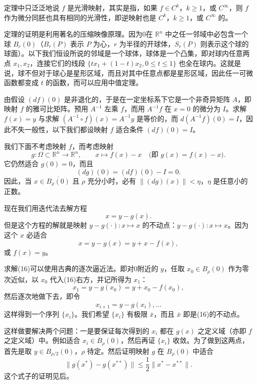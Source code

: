 定理中只泛泛地说 $f$ 是光滑映射，其实是指，如果 $f\in C^k$，$k\ge1$，或 $C^\infty$，则 $f$ 作为微分同胚也具有相同的光滑性，即逆映射也是 $C^k$，$k\ge1$，或 $C^\infty$ 的。

定理的证明是利用著名的压缩映像原理。因为0在 $\mathbb R^n$ 中之任一邻域中必包含一个球 $B_r(0)$（$B_r(P)$ 表示 $P$ 为心，$r$ 为半径的开球体，$S_r(P)$ 则表示这个球的球面）。以下我们恒设所说的邻域是一个球体，球体是一个凸集，即对球内任意两点 $x_1,x_2$，连接它们的线段 $\{tx_1+(1-t)x_2,0\le t\le1\}$ 也全在球内。这就是说，球不但对于球心是星形区域，而且对其中任意点都是星形区域，因此任一可微函数都变成 $t$ 的函数，而可以应用中值定理。

由假设 $(df)(0)$ 是非退化的，于是在一定坐标系下它是一个非奇异矩阵 $A$，即映射 $f$ 的雅可比矩阵。预用 $A^{-1}$ 左乘 $f$，而用 $A^{-1}f$ 在 $x=0$ 的微分为 $I$。求解 $f(x)=y$ 与求解 $(A^{-1}\circ f)(x)=A^{-1}y$ 是等价的，而 $d(A^{-1}f)(0)=I$，因此不失一般性，以下我们都设映射 $f$ 适合条件 $(df)(0)=I$。

我们下面不考虑映射 $f$，而考虑映射
\begin{equation}
 g:\Omega\subset\mathbb R^n\to\mathbb R^n,
 \qquad x\longmapsto f(x)-x\quad\text{(即 }g(x)=f(x)-x\text{)}.
 \tag{14}
\end{equation}
它仍然适合 $g(0)=0$，而且
\begin{equation}
 (dg)(0)=(df)(0)-I=0.
 \tag{15}
\end{equation}
因此，当 $x\in\overline{B_\rho(0)}$ 且 $\rho$ 充分小时，必有 $\|(dg)(x)\|<\eta$，$\eta$ 是任意小的正数。

现在我们用迭代法去解方程
\begin{equation}
 x=y-g(x).
 \tag{16}
\end{equation}
但是这个方程的解就是映射 $y-g(\cdot):x\mapsto x$ 的不动点：$y-g(\cdot):x\mapsto x$。因为这个 $x$ 必适合
\[
 x=y-g(x)=y+x-f(x),
\]
或 $f(x)=y$。

求解(16)可以使用古典的逐次逼近法。即对0附近的 $y$，任取 $x_0\in B_\rho(0)$ 作为零次近似，以 $x_0$ 代入(16)右方，并记所得为 $x_1$：
\[
 x_1=y-g(x_0)=y+x_0-f(x_0),
\]
然后逐次地做下去，即令
\begin{equation}
 x_{i+1}=y-g(x_i),\ldots
 \tag{17}
\end{equation}
这样得到一个序列 $\{x_i\}$。我们希望 $\{x_i\}$ 有极限 $\bar x$，而且 $\bar x$ 即是(16)的不动点。

这样做要解决两个问题：一是要保证每次得到的 $x_i$ 都在 $g(x)$ 之定义域（亦即 $f$ 之定义域）中。例如适合 $x_i\in B_\rho(0)$，然后再证 $\{x_i\}$ 收敛。为了做到这两点，首先是取 $y\in B_{\rho/2}(0)$，$\rho$ 待定。然后证明映射 $g$ 在 $B_\rho(0)$ 中适合
\begin{equation}
 \|g(x^*)-g(x^{**})\|\le\frac12\|x^*-x^{**}\|.
 \tag{18}
\end{equation}
这个式子的证明见后。

